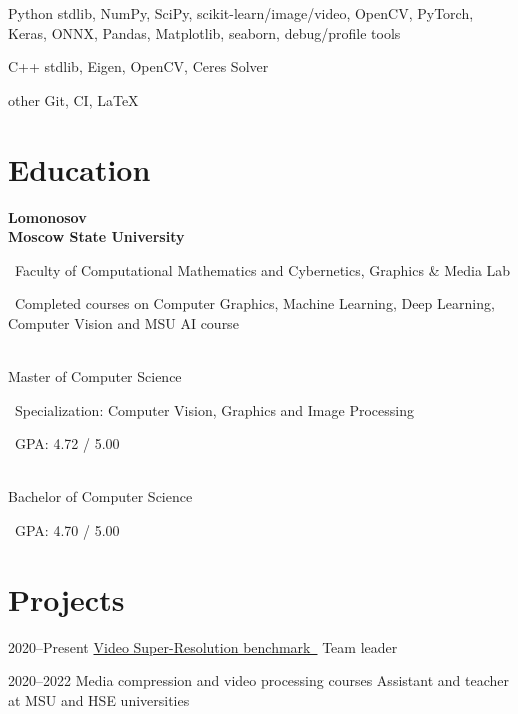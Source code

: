 \documentclass{tccv}
\newcommand{\itempoint}{\faAngleDoubleRight~}
\begin{document}
\begin{factlist}

\item{Python}
     {stdlib, NumPy, SciPy, scikit-learn/image/video, OpenCV, PyTorch, Keras, ONNX, Pandas, Matplotlib, seaborn, debug/profile tools}

\item{C++}
     {stdlib, Eigen, OpenCV, Ceres Solver}

\item{other}
     {Git, CI, \LaTeX}

\end{factlist}

\vspace{200pt}

\section{Education}

{\Large\textbf{Lomonosov\\Moscow State University}}
\smallskip     

     \itempoint Faculty of Computational Mathematics and Cybernetics, Graphics \& Media Lab
     
     \itempoint Completed courses on Computer Graphics, Machine Learning, Deep Learning, Computer Vision and MSU AI course

\bigskip
{\\[1pt]}%
{\Large{Master of Computer Science}}
\smallskip


     \itempoint Specialization: Computer Vision, Graphics and Image Processing


     \itempoint GPA: 4.72 / 5.00

\bigskip
{\\[1pt]}%
{\Large{Bachelor of Computer Science}}
\smallskip

     \itempoint GPA: 4.70 / 5.00

\section{Projects}

\begin{yearlist}

\item{2020--Present}
     {\href{https://videoprocessing.ai/benchmarks/video-super-resolution.html}{Video Super-Resolution benchmark~\faExternalLink*}}
     {Team leader}

\item{2020--2022}
     {Media compression and video processing courses}
     {Assistant and teacher at MSU and HSE universities} 

\end{yearlist}
\end{document}
